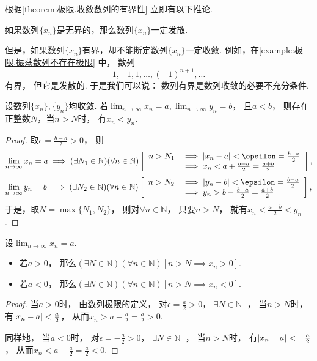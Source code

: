 根据\cref{theorem:极限.收敛数列的有界性} 立即有以下推论.
\begin{corollary}
如果数列\(\{x_n\}\)是无界的，那么数列\(\{x_n\}\)一定发散.
\end{corollary}
但是，如果数列\(\{x_n\}\)有界，却不能断定数列\(\{x_n\}\)一定收敛.
例如，在\cref{example:极限.振荡数列不存在极限} 中，
数列\[
	1,-1,1,\dotsc,(-1)^{n+1},\dotsc
\]有界，
但它是发散的.
于是我们可以说：
数列有界是数列收敛的必要不充分条件.

\begin{theorem}[收敛数列的保序性]\label{theorem:极限.收敛数列的保序性}
设数列\(\{x_n\},\{y_n\}\)均收敛.
若\(\lim_{n\to\infty} x_n = a,
\lim_{n\to\infty} y_n = b\)，
且\(a < b\)，
则存在正整数\(N\)，当\(n>N\)时，
有\(x_n < y_n\).
\begin{proof}
取\(\epsilon=\frac{b-a}2>0\)，
则\[
	\lim_{n\to\infty} x_n = a
	\implies
	(\exists N_1\in\mathbb{N})(\forall n\in\mathbb{N})
	\left[
		\begin{array}{rl}
			n>N_1
			&\implies
			\abs{x_n - a} < \epsilon = \frac{b-a}2 \\
			&\implies
			x_n < a + \frac{b-a}2 = \frac{a+b}2
		\end{array}
	\right],
\]\[
	\lim_{n\to\infty} y_n = b
	\implies
	(\exists N_2\in\mathbb{N})(\forall n\in\mathbb{N})
	\left[
		\begin{array}{rl}
			n>N_2
			&\implies
			\abs{y_n - b} < \epsilon = \frac{b-a}2 \\
			&\implies
			y_n > b - \frac{b-a}2 = \frac{a+b}2
		\end{array}
	\right],
\]
于是，取\(N = \max\{N_1,N_2\}\)，
则对\(\forall n\in\mathbb{N}\)，
只要\(n>N\)，
就有\(x_n < \frac{a+b}2 < y_n\).
\end{proof}
\end{theorem}

\begin{corollary}[收敛数列的保号性]\label{theorem:极限.收敛数列的保号性}
设\(\lim_{n\to\infty}x_n = a\).
\begin{itemize}
	\item 若\(a > 0\)，
	那么\((\exists N\in\mathbb{N})
	(\forall n\in\mathbb{N})
	[n>N \implies x_n > 0]\).

	\item 若\(a < 0\)，
	那么\((\exists N\in\mathbb{N})
	(\forall n\in\mathbb{N})
	[n>N \implies x_n < 0]\).
\end{itemize}
\begin{proof}
当\(a > 0\)时，
由数列极限的定义，
对\(\epsilon = \frac{a}{2} > 0\)，
\(\exists N \in \mathbb{N}^+\)，
当\(n > N\)时，
有\(\abs{x_n - a} < \frac{a}{2}\)，
从而\(x_n > a - \frac{a}{2} = \frac{a}{2} > 0\).

同样地，
当\(a < 0\)时，
对\(\epsilon = -\frac{a}{2} > 0\)，
\(\exists N \in \mathbb{N}^+\)，
当\(n > N\)时，
有\(\abs{x_n - a} < -\frac{a}{2}\)，
从而\(x_n < a - \frac{a}{2} = \frac{a}{2} < 0\).
\end{proof}
\end{corollary}

